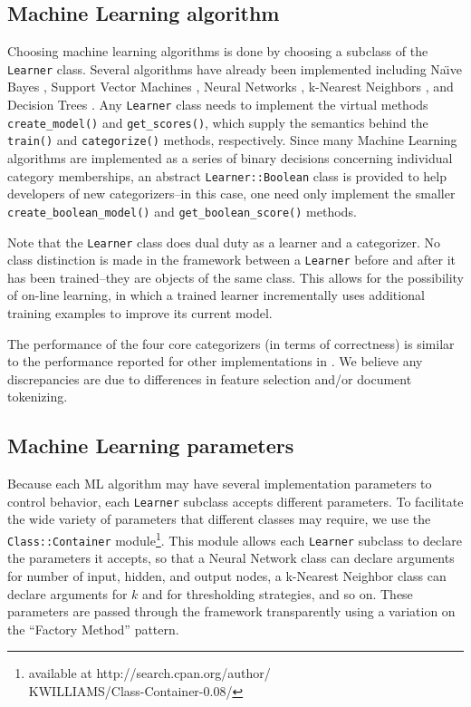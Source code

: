 \documentclass[twocolumn]{article}
\begin{document}
\subsection*{Machine Learning algorithm}
Choosing machine learning algorithms is done
by choosing a subclass of the \texttt{Learner} class.  Several
algorithms have already been implemented including Na\"\i ve Bayes
\cite{lewis:98}, Support Vector Machines \cite{scholkopf:99}
\cite{cortes:95}, Neural Networks \cite{calvo:01} \cite{yang:99},
k-Nearest Neighbors \cite{yang:99}, and Decision Trees
\cite{quinlan:89}.  Any \texttt{Learner} class needs to implement the
virtual methods \texttt{create\_model()} and \texttt{get\_scores()},
which supply the semantics behind the \texttt{train()} and
\texttt{categorize()} methods, respectively.  Since many Machine
Learning algorithms are implemented as a series of binary decisions
concerning individual category memberships, an abstract
\texttt{Learner::Boolean} class is provided to help developers of new
categorizers--in this case, one need only implement the smaller
\texttt{create\_boolean\_model()} and \texttt{get\_boolean\_score()}
methods.

Note that the \texttt{Learner} class does dual duty as a learner and a
categorizer.  No class distinction is made in the framework between a
\texttt{Learner} before and after it has been trained--they are
objects of the same class.  This allows for the possibility of on-line
learning, in which a trained learner incrementally uses additional
training examples to improve its current model.

The performance of the four core categorizers (in terms of
correctness) is similar to the performance reported for other
implementations in \cite{yang:99}.  We believe any discrepancies are
due to differences in feature selection and/or document tokenizing.

\subsection*{Machine Learning parameters}
Because each ML algorithm may have several implementation parameters
to control behavior, each \texttt{Learner} subclass accepts different
parameters.  To facilitate the wide variety of parameters that
different classes may require, we use the \texttt{Class::Container}
module\footnote{available at http://search.cpan.org/author/\\
KWILLIAMS/Class-Container-0.08/}.  This module allows each
\texttt{Learner} subclass to declare the parameters it accepts, so
that a Neural Network class can declare arguments for number of input,
hidden, and output nodes, a k-Nearest Neighbor class can declare
arguments for $k$ and for thresholding strategies, and so on.  These
parameters are passed through the framework transparently using a
variation on the ``Factory Method'' pattern. \cite{gamma:95}
\end{document}
